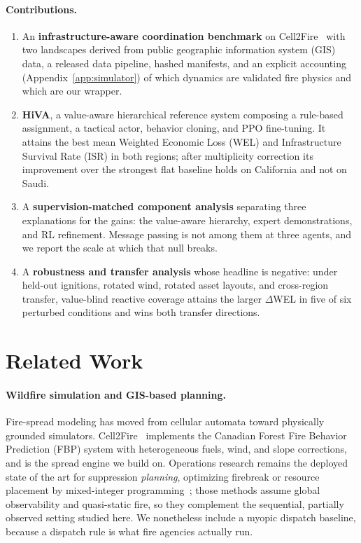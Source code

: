 \documentclass[letterpaper]{article}
\begin{document}
\paragraph{Contributions.}
\begin{enumerate}\itemsep0pt
    \item An \textbf{infrastructure-aware coordination benchmark} on Cell2Fire~\citep{pais2021cell2fire} with two landscapes derived from public geographic information system (GIS) data, a released data pipeline, hashed manifests, and an explicit accounting (Appendix~\ref{app:simulator}) of which dynamics are validated fire physics and which are our wrapper.
    \item \textbf{HiVA}, a value-aware hierarchical reference system composing a rule-based assignment, a tactical actor, behavior cloning, and PPO fine-tuning. It attains the best mean Weighted Economic Loss (WEL) and Infrastructure Survival Rate (ISR) in both regions; after multiplicity correction its improvement over the strongest flat baseline holds on California and not on Saudi.
    \item A \textbf{supervision-matched component analysis} separating three explanations for the gains: the value-aware hierarchy, expert demonstrations, and RL refinement. Message passing is not among them at three agents, and we report the scale at which that null breaks.
    \item A \textbf{robustness and transfer analysis} whose headline is negative: under held-out ignitions, rotated wind, rotated asset layouts, and cross-region transfer, value-blind reactive coverage attains the larger $\Delta$WEL in five of six perturbed conditions and wins both transfer directions.
\end{enumerate}

\section{Related Work}
\label{sec:related}

\paragraph{Wildfire simulation and GIS-based planning.} Fire-spread modeling has moved from cellular automata toward physically grounded simulators. Cell2Fire~\citep{pais2021cell2fire} implements the Canadian Forest Fire Behavior Prediction (FBP) system with heterogeneous fuels, wind, and slope corrections, and is the spread engine we build on. Operations research remains the deployed state of the art for suppression \emph{planning}, optimizing firebreak or resource placement by mixed-integer programming~\citep{hu2009wildfire}; those methods assume global observability and quasi-static fire, so they complement the sequential, partially observed setting studied here. We nonetheless include a myopic dispatch baseline, because a dispatch rule is what fire agencies actually run.
\end{document}
